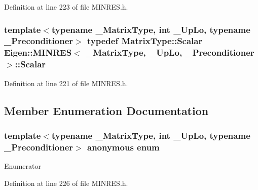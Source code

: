 Definition at line 223 of file M\+I\+N\+R\+E\+S.\+h.

\hypertarget{class_eigen_1_1_m_i_n_r_e_s_ac6a380b335865e7ff16d00ef62e48389}{}
\subsubsection[{Scalar}]{\setlength{\rightskip}{0pt plus 5cm}template$<$typename \+\_\+\+Matrix\+Type, int \+\_\+\+Up\+Lo, typename \+\_\+\+Preconditioner$>$ typedef Matrix\+Type\+::\+Scalar {\bf Eigen\+::\+M\+I\+N\+R\+E\+S}$<$ \+\_\+\+Matrix\+Type, \+\_\+\+Up\+Lo, \+\_\+\+Preconditioner $>$\+::{\bf Scalar}}\label{class_eigen_1_1_m_i_n_r_e_s_ac6a380b335865e7ff16d00ef62e48389}


Definition at line 221 of file M\+I\+N\+R\+E\+S.\+h.



\subsection{Member Enumeration Documentation}
\hypertarget{class_eigen_1_1_m_i_n_r_e_s_ad8c4b34431942a17a145a5a602178812}{}\subsubsection[{anonymous enum}]{\setlength{\rightskip}{0pt plus 5cm}template$<$typename \+\_\+\+Matrix\+Type, int \+\_\+\+Up\+Lo, typename \+\_\+\+Preconditioner$>$ anonymous enum}\label{class_eigen_1_1_m_i_n_r_e_s_ad8c4b34431942a17a145a5a602178812}
\begin{Desc}
\item[Enumerator]\par
\begin{description}
\item[{\em 
\hypertarget{class_eigen_1_1_m_i_n_r_e_s_ad8c4b34431942a17a145a5a602178812a2fc247046ae2082cb2c3d14b3fa5e774}{}Up\+Lo\label{class_eigen_1_1_m_i_n_r_e_s_ad8c4b34431942a17a145a5a602178812a2fc247046ae2082cb2c3d14b3fa5e774}
}]\end{description}
\end{Desc}


Definition at line 226 of file M\+I\+N\+R\+E\+S.\+h.



